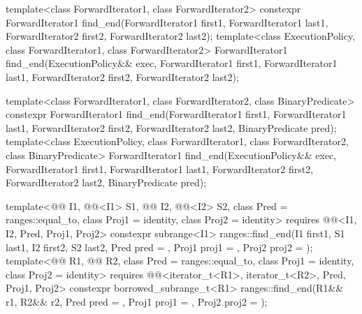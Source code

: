 %
\begin{itemdecl}
template<class ForwardIterator1, class ForwardIterator2>
  constexpr ForwardIterator1
    find_end(ForwardIterator1 first1, ForwardIterator1 last1,
             ForwardIterator2 first2, ForwardIterator2 last2);
template<class ExecutionPolicy, class ForwardIterator1, class ForwardIterator2>
  ForwardIterator1
    find_end(ExecutionPolicy&& exec,
             ForwardIterator1 first1, ForwardIterator1 last1,
             ForwardIterator2 first2, ForwardIterator2 last2);

template<class ForwardIterator1, class ForwardIterator2,
         class BinaryPredicate>
  constexpr ForwardIterator1
    find_end(ForwardIterator1 first1, ForwardIterator1 last1,
             ForwardIterator2 first2, ForwardIterator2 last2,
             BinaryPredicate pred);
template<class ExecutionPolicy, class ForwardIterator1, class ForwardIterator2,
         class BinaryPredicate>
  ForwardIterator1
    find_end(ExecutionPolicy&& exec,
             ForwardIterator1 first1, ForwardIterator1 last1,
             ForwardIterator2 first2, ForwardIterator2 last2,
             BinaryPredicate pred);

template<@@ I1, @@<I1> S1, @@ I2, @@<I2> S2,
         class Pred = ranges::equal_to, class Proj1 = identity, class Proj2 = identity>
  requires @@<I1, I2, Pred, Proj1, Proj2>
  constexpr subrange<I1>
    ranges::find_end(I1 first1, S1 last1, I2 first2, S2 last2, Pred pred = {},
                     Proj1 proj1 = {}, Proj2 proj2 = {});
template<@@ R1, @@ R2,
         class Pred = ranges::equal_to, class Proj1 = identity, class Proj2 = identity>
  requires @@<iterator_t<R1>, iterator_t<R2>, Pred, Proj1, Proj2>
  constexpr borrowed_subrange_t<R1>
    ranges::find_end(R1&& r1, R2&& r2, Pred pred = {},
                     Proj1 proj1 = {}, Proj2 proj2 = {});
\end{itemdecl}

